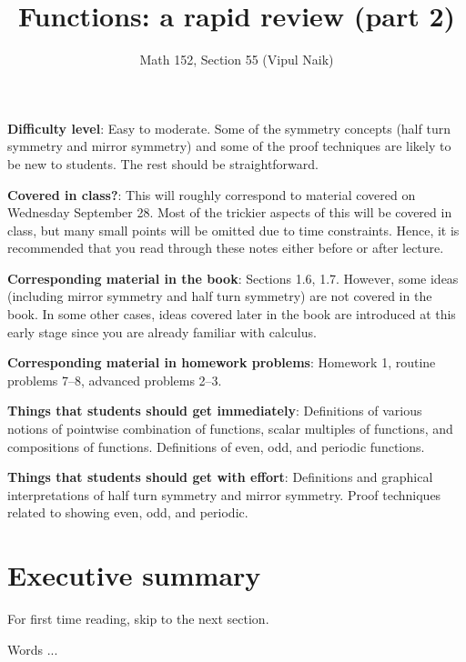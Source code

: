 \documentclass{amsart}
\title{Functions: a rapid review (part 2)}
\author{Math 152, Section 55 (Vipul Naik)}
\begin{document}
\maketitle

{\bf Difficulty level}: Easy to moderate. Some of the symmetry
concepts (half turn symmetry and mirror symmetry) and some of the
proof techniques are likely to be new to students. The rest should be
straightforward.

{\bf Covered in class?}: This will roughly correspond to material
covered on Wednesday September 28. Most of the trickier aspects of this
will be covered in class, but many small points will be omitted due to
time constraints. Hence, it is recommended that you read through these
notes either before or after lecture.

{\bf Corresponding material in the book}: Sections 1.6, 1.7. However,
some ideas (including mirror symmetry and half turn symmetry) are not
covered in the book. In some other cases, ideas covered later in the
book are introduced at this early stage since you are already familiar
with calculus.

{\bf Corresponding material in homework problems}: Homework 1, routine
problems 7--8, advanced problems 2--3.
 
{\bf Things that students should get immediately}: Definitions of
various notions of pointwise combination of functions, scalar
multiples of functions, and compositions of functions. Definitions of
even, odd, and periodic functions.

{\bf Things that students should get with effort}: Definitions and
graphical interpretations of half turn symmetry and mirror
symmetry. Proof techniques related to showing even, odd, and periodic.

\section*{Executive summary}

For first time reading, skip to the next section.

Words ...
\end{document}
